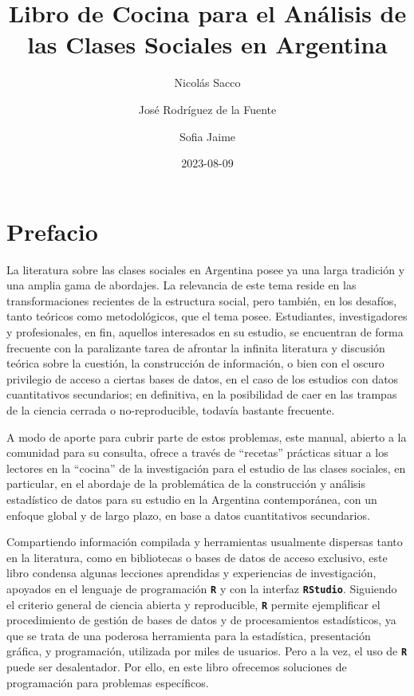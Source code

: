 \documentclass[
]{article}
\title{Libro de Cocina para el Análisis de las Clases Sociales en Argentina}
\author{Nicolás Sacco \and José Rodríguez de la Fuente \and Sofia Jaime}
\date{2023-08-09}
\begin{document}
\maketitle

{
\setcounter{tocdepth}{2}
\tableofcontents
}
\hypertarget{prefacio}{%
\section*{Prefacio}\label{prefacio}}

La literatura sobre las clases sociales en Argentina posee ya una larga tradición y una amplia gama de abordajes. La relevancia de este tema reside en las transformaciones recientes de la estructura social, pero también, en los desafíos, tanto teóricos como metodológicos, que el tema posee. Estudiantes, investigadores y profesionales, en fin, aquellos interesados en su estudio, se encuentran de forma frecuente con la paralizante tarea de afrontar la infinita literatura y discusión teórica sobre la cuestión, la construcción de información, o bien con el oscuro privilegio de acceso a ciertas bases de datos, en el caso de los estudios con datos cuantitativos secundarios; en definitiva, en la posibilidad de caer en las trampas de la ciencia cerrada o no-reproducible, todavía bastante frecuente.

A modo de aporte para cubrir parte de estos problemas, este manual, abierto a la comunidad para su consulta, ofrece a través de ``recetas'' prácticas situar a los lectores en la ``cocina'' de la investigación para el estudio de las clases sociales, en particular, en el abordaje de la problemática de la construcción y análisis estadístico de datos para su estudio en la Argentina contemporánea, con un enfoque global y de largo plazo, en base a datos cuantitativos secundarios.

Compartiendo información compilada y herramientas usualmente dispersas tanto en la literatura, como en bibliotecas o bases de datos de acceso exclusivo, este libro condensa algunas lecciones aprendidas y experiencias de investigación, apoyados en el lenguaje de programación \textbf{\texttt{R}} y con la interfaz \textbf{\texttt{RStudio}}. Siguiendo el criterio general de ciencia abierta y reproducible, \textbf{\texttt{R}} permite ejemplificar el procedimiento de gestión de bases de datos y de procesamientos estadísticos, ya que se trata de una poderosa herramienta para la estadística, presentación gráfica, y programación, utilizada por miles de usuarios. Pero a la vez, el uso de \textbf{\texttt{R}} puede ser desalentador. Por ello, en este libro ofrecemos soluciones de programación para problemas específicos.
\end{document}
